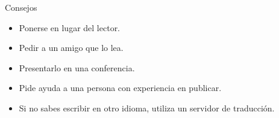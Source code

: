 \begin{frame}{Consejos}
\begin{block}{}
\begin{itemize}
    \item Ponerse en lugar del lector.
    \item Pedir a un amigo que lo lea.
    \item Presentarlo en una conferencia.
    \item Pide ayuda a una persona con experiencia en publicar.
    \item Si no sabes escribir en otro idioma, utiliza un servidor de traducción.
\end{itemize}
\end{block}   
\end{frame}

